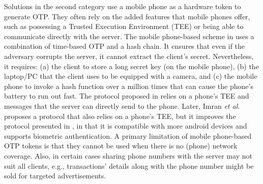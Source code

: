 Solutions in the second category use a mobile phone as a hardware token to generate OTP. They often rely on the added features that mobile phones offer, such as possessing a Trusted Execution Environment (TEE) or being able to communicate directly with the server. The mobile phone-based scheme in  \cite{KoganMB17} uses a combination of time-based OTP and a hash chain. It ensures that even if the adversary corrupts the server, it cannot extract the client's secret. Nevertheless, it requires: (a) the client to store a long secret key (on the mobile phone), (b)  the laptop/PC that the client uses to be equipped with a camera, and (c)  the mobile phone to invoke a hash function over a million times that can cause the phone's battery to run out fast. The protocol proposed in \cite{KonothFFARB20} relies on a phone's TEE  and messages that the server can directly send to the phone. Later,  Imran \textit{et al.} \cite{SARA22} proposes a protocol that also relies on a phone's TEE, but it improves the protocol presented in \cite{KonothFFARB20}, in that it is compatible with more android devices and supports biometric authentication.  A primary limitation of mobile phone-based OTP tokens is that they cannot be used when there is no (phone) network coverage. Also, in certain cases sharing phone numbers with the server may not suit all clients, e.g., transactions' details along with the phone number might be sold for targeted advertisements. 
%





%








